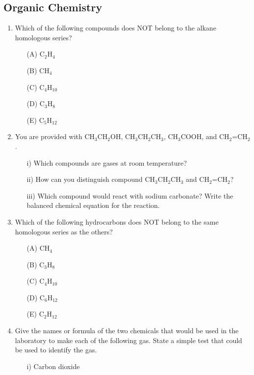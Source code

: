 \subsection{Organic Chemistry}

\begin{enumerate}
	\item Which of the following compounds does NOT belong to the alkane homologous series?
	\begin{enumerate}[topsep=0ex,itemsep=0ex,partopsep=1ex,parsep=1ex]
		\item[(A)] C$_2$H$_4$
		\item[(B)] CH$_4$
		\item[(C)] C$_4$H$_{10}$
		\item[(D)] C$_3$H$_8$
		\item[(E)] C$_5$H$_{12}$
	\end{enumerate}
	
	\item You are provided with CH$_3$CH$_2$OH, CH$_3$CH$_2$CH$_3$, CH$_3$COOH, and CH$_2$=CH$_2$. 
	\begin{enumerate}[topsep=0ex,itemsep=0ex,partopsep=1ex,parsep=1ex]
		\item[i)] Which compounds are gases at room temperature? 
		\item[ii)] How can you distinguish compound CH$_3$CH$_2$CH$_3$ and CH$_2$=CH$_2$?
		\item[iii)] Which compound would react with sodium carbonate? Write the balanced chemical equation for the reaction. 
	\end{enumerate}
	
	\item Which of the following hydrocarbons does NOT belong to the same homologous series as the others?
	\begin{enumerate}[topsep=0ex,itemsep=0ex,partopsep=1ex,parsep=1ex]
		\item[(A)] CH$_4$
		\item[(B)] C$_3$H$_8$
		\item[(C)] C$_4$H$_{10}$
		\item[(D)] C$_6$H$_{12}$
		\item[(E)] C$_2$H$_{12}$
	\end{enumerate}
	
	\item Give the names or formula of the two chemicals that would be used in the laboratory to make each of the following gas. State a simple test that could be used to identify the gas. 
	\begin{enumerate}[topsep=0ex,itemsep=0ex,partopsep=1ex,parsep=1ex]
		\item[i)] Carbon dioxide
	\end{enumerate}
	

\end{enumerate}
